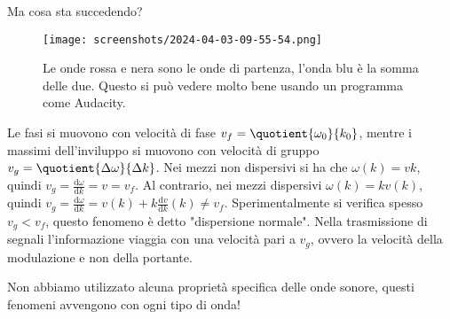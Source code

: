 Ma cosa sta succedendo?
\begin{figure}[H]
	\centering
	\texttt{[image: screenshots/2024-04-03-09-55-54.png]}
	\caption{Le onde rossa e nera sono le onde di partenza, l'onda blu è la somma delle due. Questo si può vedere molto bene usando un programma come Audacity.}
\end{figure}
Le fasi si muovono con velocità di fase \(v_f = \quotient{\omega _0}{k_0} \), mentre i massimi dell'inviluppo si muovono con velocità di gruppo \(v_g = \quotient{\Delta \omega }{\Delta k} \). Nei mezzi non dispersivi si ha che \(\omega (k) = vk\), quindi \(v_g = \frac{\mathrm{d} \omega }{\mathrm{d} k} = v = v_f \). Al contrario, nei mezzi dispersivi \(\omega (k) = k v(k)\), quindi \(v_g = \frac{\mathrm{d} \omega }{\mathrm{d} k} = v(k) + k \frac{\mathrm{d} v}{\mathrm{d} k}(k) \neq v_f \).
Sperimentalmente si verifica spesso \(v_g < v_f\), questo fenomeno è detto "dispersione normale". Nella trasmissione di segnali l'informazione viaggia con una velocità pari a \(v_g\), ovvero la velocità della modulazione e non della portante.
\begin{note}
	Non abbiamo utilizzato alcuna proprietà specifica delle onde sonore, questi fenomeni avvengono con ogni tipo di onda!
\end{note}